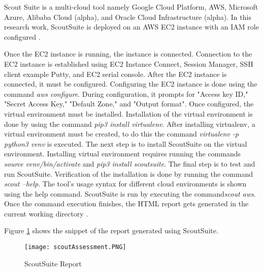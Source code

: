 \par Scout Suite is a multi-cloud tool namely Google Cloud Platform, AWS, Microsoft Azure, Alibaba Cloud (alpha), and
Oracle Cloud Infrastructure (alpha). In this research work, ScoutSuite is deployed on an AWS EC2 instance with an
IAM role configured \cite{73}.

\par Once the EC2 instance is running, the instance is connected.
Connection to the EC2 instance is established using EC2 Instance Connect, Session Manager, SSH client example Putty, and EC2 serial console.
After the EC2 instance is connected, it must be configured.
Configuring the EC2 instance is done using the command \textit{aws configure}.
During configuration, it prompts for "Access key ID," "Secret Access Key," "Default Zone," and "Output format".
Once configured, the virtual environment must be installed.
Installation of the virtual environment is done by using the command \textit{pip3 install virtualenv}.
After installing virtualenv, a virtual environment must be created, to do this the command \textit{virtualenv -p python3 venv} is executed.
The next step is to install ScoutSuite on the virtual environment.
Installing virtual environment requires running the commands \textit{source venv/bin/activate} and \textit{pip3 install scoutsuite}.
The final step is to test and run ScoutSuite. Verification of the installation is done by running the command \textit{scout --help}.
The tool's usage syntax for different cloud environments is shown using the help command.
ScoutSuite is run by executing the command\textit{scout aws}.
Once the command execution finishes, the HTML report gets
generated in the current working directory \cite{72}.

Figure \ref{fig:deployscoutsuite} shows the snippet of the report generated using ScoutSuite.

\begin{figure}
    \centering
    \texttt{[image: scoutAssessment.PNG]}
    \caption{ScoutSuite Report}
    \label{fig:deployscoutsuite}
\end{figure}